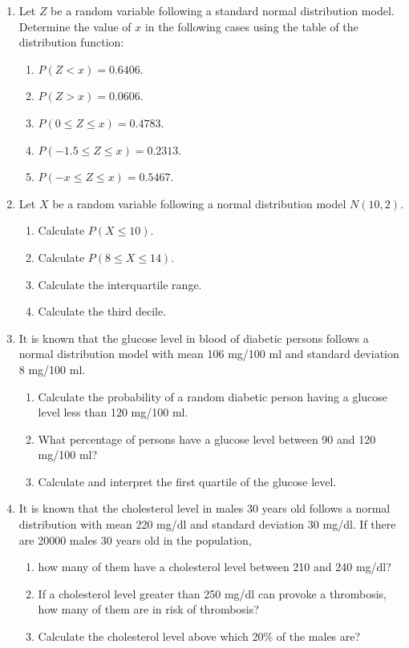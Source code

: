 \begin{enumerate}[leftmargin=*,resume]
\item Let $Z$ be a random variable following a standard normal distribution model.
Determine the value of $x$ in the following cases using the table of the distribution function:
\begin{enumerate}
\item $P(Z<x)=0.6406$.
\item $P(Z>x)=0.0606$.
\item $P(0\leq Z\leq x)=0.4783$.
\item $P(-1.5\leq Z\leq x)=0.2313$.
\item $P(-x\leq Z\leq x)=0.5467$.
\end{enumerate}

\item Let $X$ be a random variable following a normal distribution model $N(10,2)$.
\begin{enumerate}
\item Calculate $P(X\leq 10)$.
\item Calculate $P(8\leq X\leq 14)$.
\item Calculate the interquartile range. 
\item Calculate the third decile. 
\end{enumerate}

\item It is known that the glucose level in blood of diabetic persons follows a normal distribution model with
mean 106 mg/100 ml and standard deviation 8 mg/100 ml.
\begin{enumerate}
\item Calculate the probability of a random diabetic person having a glucose level less than 120 mg/100 ml. 
\item What percentage of persons have a glucose level between 90 and 120 mg/100 ml?
\item Calculate and interpret the first quartile of the glucose level. 
\end{enumerate}

\item It is known that the cholesterol level in males 30 years old follows a normal distribution with mean 220 mg/dl and
standard deviation 30 mg/dl. 
If there are 20000 males 30 years old in the population,
\begin{enumerate}
\item how many of them have a cholesterol level between 210 and 240 mg/dl?
\item If a cholesterol level greater than 250 mg/dl can provoke a thrombosis, how many of them are in risk of
thrombosis?
\item Calculate the cholesterol level above which 20\% of the males are?
\end{enumerate}


\end{enumerate}
